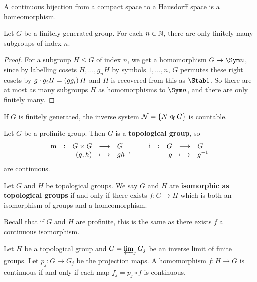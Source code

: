 \begin{proposition}
A continuous bijection from a compact space to a Hausdorff space is a homeomorphism.
\end{proposition}

\begin{lemma}
\label{lem:1.2.18}
Let $ G $ be a finitely generated group. For each $ n \in \mathbb{N} $, there are only finitely many subgroups of index $ n $.
\end{lemma}

\begin{proof}
For a subgroup $ H \le G $ of index $ n $, we get a homomorphism $ G \to \Sym n $, since by labelling cosets $ H, \dots, g_nH $ by symbols $ 1, \dots, n $, $ G $ permutes these right cosets by $ g \cdot g_iH = \br{gg_i}H $ and $ H $ is recovered from this as $ \Stab 1 $. So there are at most as many subgroups $ H $ as homomorphisms to $ \Sym n $, and there are only finitely many.
\end{proof}

\begin{corollary}
If $ G $ is finitely generated, the inverse system $ \NNN = \cbr{N \triangleleft_\f G} $ is countable.
\end{corollary}

\begin{proposition}
Let $ G $ be a profinite group. Then $ G $ is a \textbf{topological group}, so
$$ \function[\m]{G \times G}{G}{\br{g, h}}{gh}, \qquad \function[\i]{G}{G}{g}{g^{-1}} $$
are continuous.
\end{proposition}

\begin{definition}
Let $ G $ and $ H $ be topological groups. We say $ G $ and $ H $ are \textbf{isomorphic as topological groups} if and only if there exists $ f : G \to H $ which is both an isomorphism of groups and a homeomorphism.
\end{definition}

Recall that if $ G $ and $ H $ are profinite, this is the same as there exists $ f $ a continuous isomorphism.

\begin{proposition}
\label{prop:1.2.25}
Let $ H $ be a topological group and $ G = \varprojlim_j G_j $ be an inverse limit of finite groups. Let $ p_j : G \to G_j $ be the projection maps. A homomorphism $ f : H \to G $ is continuous if and only if each map $ f_j = p_j \circ f $ is continuous.
\end{proposition}


